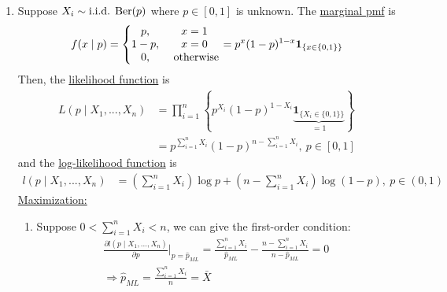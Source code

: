 \documentclass[11pt]{elegantbook}
\begin{document}
\begin{example}\quad
\begin{enumerate}
    \item Suppose $X_i\sim \textnormal{i.i.d. Ber}(p)$ where $p\in[0,1]$ is unknown. The \underline{marginal pmf} is
    \begin{equation}
        \begin{aligned}
            f(x\mid p)=\left\{\begin{matrix}
                p,&x=1\\
                1-p,&x=0\\
                0,&\textnormal{ otherwise}
            \end{matrix}\right.=p^x(1-p)^{1-x}\mathbf{1}_{\{x\in\{0,1\}\}}
        \end{aligned}
        \nonumber
    \end{equation}
    Then, the \underline{likelihood function} is
    \begin{equation}
        \begin{aligned}
            L(p\mid X_1,...,X_n)&=\prod_{i=1}^n\left\{ p^{X_i}(1-p)^{1-X_i}\underbrace{\mathbf{1}_{\{X_i\in\{0,1\}\}}}_{=1}\right\}\\
            &=p^{\sum_{i=1}^n X_i}(1-p)^{n-\sum_{i=1}^n X_i}, \ p\in[0,1]
        \end{aligned}
        \nonumber
    \end{equation}
    and the \underline{log-likelihood function} is
    \begin{equation}
        \begin{aligned}
            l(p\mid X_1,...,X_n)&=(\sum_{i=1}^n X_i)\log p + (n-\sum_{i=1}^n X_i)\log (1-p),\ p\in (0,1)
        \end{aligned}
        \nonumber
    \end{equation}
    \underline{Maximization:}
    \begin{enumerate}
        \item Suppose $0<\sum_{i=1}^n X_i<n$, we can give the first-order condition:
        \begin{equation}
            \begin{aligned}
                \frac{\partial l(p\mid X_1,...,X_n)}{\partial p}\big|_{p=\hat{p}_{ML}}=\frac{\sum_{i=1}^n X_i}{\hat{p}_{ML}}-\frac{n-\sum_{i=1}^n X_i}{n-\hat{p}_{ML}}=0\\
                \Rightarrow \hat{p}_{ML}=\frac{\sum_{i=1}^n X_i}{n}=\bar{X}
            \end{aligned}
            \nonumber

\end{equation}
\end{enumerate}
\end{enumerate}
\end{example}
\end{document}
